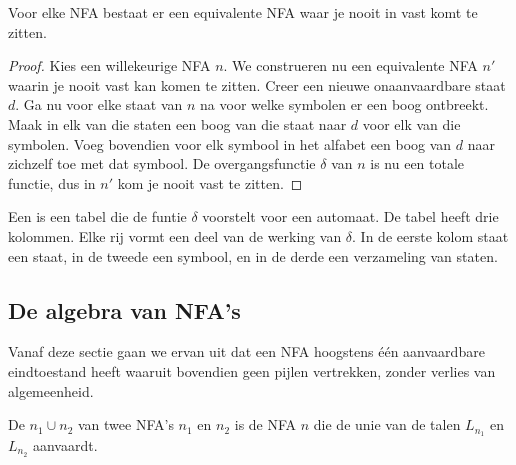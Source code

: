 \documentclass[main.tex]{subfiles}
\begin{document}
\begin{st}
  Voor elke NFA bestaat er een equivalente NFA waar je nooit in vast komt te zitten.

  \begin{proof}
    Kies een willekeurige NFA $n$.
    We construeren nu een equivalente NFA $n'$ waarin je nooit vast kan komen te zitten.
    Creer een nieuwe onaanvaardbare staat $d$. Ga nu voor elke staat van $n$ na voor welke symbolen er een boog ontbreekt.
    Maak in elk van die staten een boog van die staat naar $d$ voor elk van die symbolen.
    Voeg bovendien voor elk symbool in het alfabet een boog van $d$ naar zichzelf toe met dat symbool.
    De overgangsfunctie $\delta$ van $n$ is nu een totale functie, dus in $n'$ kom je nooit vast te zitten.
  \end{proof}
\end{st}

\begin{de}
  Een  is een tabel die de funtie $\delta$ voorstelt voor een automaat.
  De tabel heeft drie kolommen. Elke rij vormt een deel van de werking van $\delta$.
  In de eerste kolom staat een staat, in de tweede een symbool, en in de derde een verzameling van staten.                   
\end{de}

\subsection{De algebra van NFA's}
Vanaf deze sectie gaan we ervan uit dat een NFA hoogstens \'e\'en aanvaardbare eindtoestand heeft waaruit bovendien geen pijlen vertrekken, zonder verlies van algemeenheid.
\label{sec:de-algebra-van-nfas}

\begin{de}
  De  $n_{1} \cup n_{2}$ van twee NFA's $n_{1}$ en $n_{2}$ is de NFA $n$ die de unie van de talen $L_{n_{1}}$ en $L_{n_{2}}$ aanvaardt.
\end{de}
\end{document}

